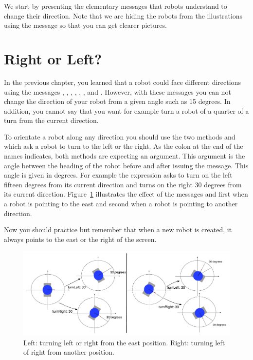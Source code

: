 We start by presenting the elementary messages that robots understand to change their direction. Note that we are hiding the robots from the illustrations using the message  so that you can get clearer pictures. 


\section{Right or Left?}\label{rightleft}
In the previous chapter, you learned that a robot could face different directions using the messages , , , , , ,  and . However, with these messages you can not change the direction of your robot from a given angle such as 15 degrees. In addition, you cannot say that you want for example turn a robot of a quarter of a turn from the current direction. 

To orientate a robot along any direction you should use the two methods
\turnLeft and \turnRight which ask a robot to turn to the left or the right. As the colon at the end of the names indicates, both methods are expecting an argument. This argument is the angle between the heading of the robot before and after issuing the message. This angle is given in degrees. For example the expression  asks \caro to turn on the left fifteen degrees from its current direction and  turns on the right 30 degrees from its current direction. Figure~\ref{fig:turnLeftBoth} illustrates the effect of the messages  and  first when a robot is pointing to the east and second when a robot is pointing to another direction.  


Now you should practice but remember that when a new robot is created, it always points to the east or the right of the screen. 

\begin{figure}
\begin{center}\includegraphics[width=16cm]{turnLeftBoth}
\caption{Left: turning left or right from the east position. Right: turning left of right from another position. \label{fig:turnLeftBoth}}
\end{center}
\end{figure}


